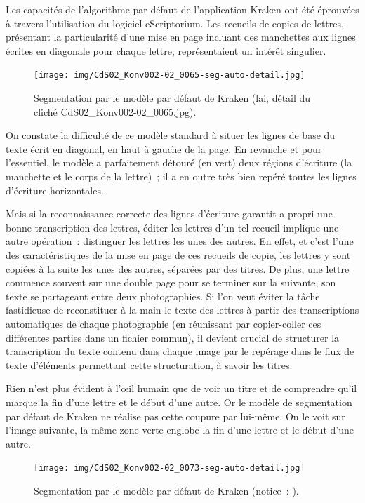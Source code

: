 \documentclass[a4paper,12pt,twoside]{book}
\begin{document}
				Les capacités de l'algorithme par défaut de l'application Kraken ont été éprouvées à travers l'utilisation du logiciel eScriptorium. Les recueils de copies de lettres, présentant la particularité d'une mise en page incluant des manchettes aux lignes écrites en diagonale pour chaque lettre, représentaient un intérêt singulier.
				
				\begin{figure}[!h]
					\centering
					\texttt{[image: img/CdS02\_Konv002-02\_0065-seg-auto-detail.jpg]}
					\caption{Segmentation par le modèle par défaut de Kraken (\gls{lai}, détail du cliché CdS02\_Konv002-02\_0065.jpg).}
					\label{seg-defaut-65}
				\end{figure}
			
				On constate la difficulté de ce modèle standard à situer les lignes de base du texte écrit en diagonal, en haut à gauche de la page. En revanche et pour l'essentiel, le modèle a parfaitement détouré (en vert) deux régions d'écriture (la manchette et le corps de la lettre)~; il a en outre très bien repéré toutes les lignes d'écriture horizontales.
				
				Mais si la reconnaissance correcte des lignes d'écriture garantit a propri une bonne transcription des lettres, éditer les lettres d'un tel recueil implique une autre opération~: distinguer les lettres les unes des autres. En effet, et c'est l'une des caractéristiques de la mise en page de ces recueils de copie, les lettres y sont copiées à la suite les unes des autres, séparées par des titres. De plus, une lettre commence souvent sur une double page pour se terminer sur la suivante, son texte se partageant entre deux photographies. Si l'on veut éviter la tâche fastidieuse de reconstituer à la main le texte des lettres à partir des transcriptions automatiques de chaque photographie (en réunissant par copier-coller ces différentes parties dans un fichier commun), il devient crucial de structurer la transcription du texte contenu dans chaque image par le repérage dans le flux de texte d'éléments permettant cette structuration, à savoir les titres.
				
				Rien n'est plus évident à l'œil humain que de voir un titre et de comprendre qu'il marque la fin d'une lettre et le début d'une autre. Or le modèle de segmentation par défaut de Kraken ne réalise pas cette coupure par lui-même. On le voit sur l'image suivante, la même zone verte englobe la fin d'une lettre et le début d'une autre.
				
				\begin{figure}[!h]
					\centering
					\texttt{[image: img/CdS02\_Konv002-02\_0073-seg-auto-detail.jpg]}
					\caption{Segmentation par le modèle par défaut de Kraken (notice~: \cite{CdS02073}).}
					\label{}
				\end{figure}
				
\end{document}
